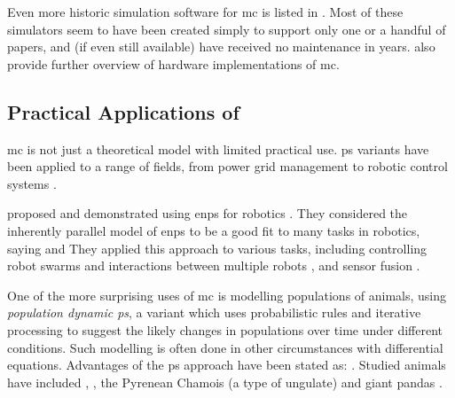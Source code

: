 Even more historic simulation software for \gls{mc} is listed in \cite{Raghavan2016}.  Most of these simulators seem to have been created simply to support only one or a handful of papers, and (if even still available) have received no maintenance in years.  \citeauthor{Zhang2020} \cite{Zhang2020} also provide further overview of hardware implementations of \gls{mc}. %



\subsection{\label{sec:psystemsuses}Practical Applications of }
\Gls{mc} is not just a theoretical model with limited practical use.  \Gls{ps} variants have been applied to a range of fields, from power grid management to robotic control systems \cite{Zhang2017}.

\citeauthor{Florea2017} proposed and demonstrated using \gls{enps} for robotics \cite{Florea2017,Florea2016,Florea2017a,Florea2019,Florea2016a,Florea2018}.  They considered the inherently parallel model of \gls{enps} to be a good fit to many tasks in robotics, saying  and   They applied this approach to various tasks, including controlling robot swarms \cite{Florea2016} and interactions between multiple robots \cite{Florea2017}, and sensor fusion \cite{Florea2019}.

One of the more surprising uses of \gls{mc} is modelling populations of animals, using \emph{population dynamic \gls{ps}}, a variant which uses probabilistic rules and iterative processing to suggest the likely changes in populations over time under different conditions.  Such modelling is often done in other circumstances with differential equations.  Advantages of the \gls{ps} approach have been stated as: .  Studied animals have included , , the Pyrenean Chamois (a type of ungulate) \cite{Colomer2010} and giant pandas \cite{Duan2020}.

